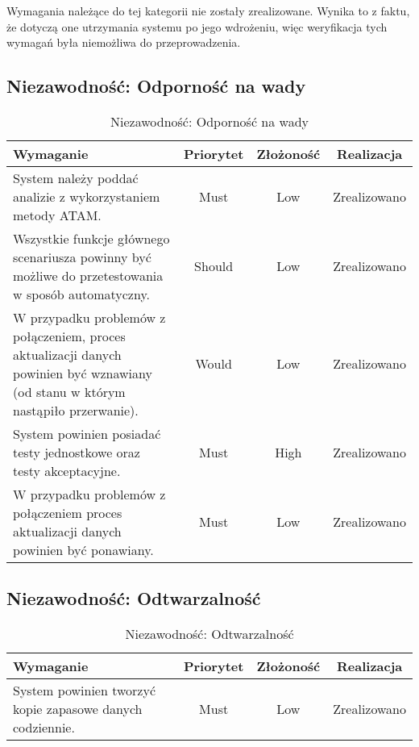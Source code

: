Wymagania należące do tej kategorii nie zostały zrealizowane. Wynika to z faktu, że dotyczą one utrzymania systemu po jego wdrożeniu, więc weryfikacja tych wymagań była niemożliwa do przeprowadzenia.	

\subsection{Niezawodność: Odporność na wady}

\begin{table}[H]
\centering
\begin{tabular}{ | p{8cm} | c | c | c | }
\hline
\textbf{Wymaganie} & \textbf{Priorytet} & \textbf{Złożoność} & \textbf{Realizacja} \\ \hline
System należy poddać analizie z wykorzystaniem metody ATAM.
 & Must & Low & Zrealizowano \\ \hline
Wszystkie funkcje głównego scenariusza powinny być możliwe do przetestowania w sposób automatyczny.
 & Should & Low & Zrealizowano \\ \hline
W przypadku problemów z połączeniem, proces aktualizacji danych powinien być wznawiany (od stanu w którym nastąpiło przerwanie). & Would & Low & Zrealizowano \\ \hline
System powinien posiadać testy jednostkowe oraz testy akceptacyjne. & Must & High & Zrealizowano \\ \hline
W przypadku problemów z połączeniem proces aktualizacji danych powinien być ponawiany. & Must & Low & Zrealizowano \\ \hline
\end{tabular}
\caption{Niezawodność: Odporność na wady}\label{tab:reqs}
\end{table}

\subsection{Niezawodność: Odtwarzalność}

\begin{table}[H]
\centering
\begin{tabular}{ | p{8cm} | c | c | c | }
\hline
\textbf{Wymaganie} & \textbf{Priorytet} & \textbf{Złożoność} & \textbf{Realizacja} \\ \hline
System powinien tworzyć kopie zapasowe danych codziennie.
 & Must & Low & Zrealizowano \\ \hline
\end{tabular}
\caption{Niezawodność: Odtwarzalność}\label{tab:reqs}
\end{table}

